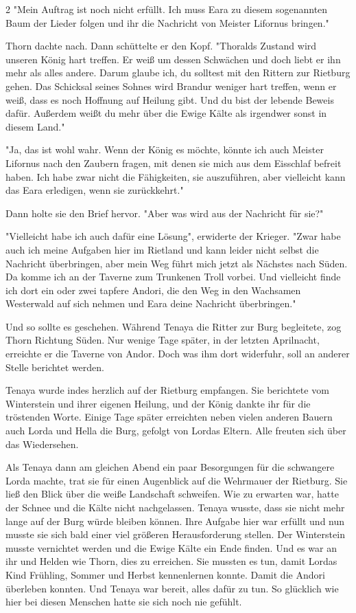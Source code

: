 \documentclass[10pt, a4paper, oneside]{book}
\begin{document}
\begin{multicols}{2}
"Mein Auftrag ist noch nicht erfüllt. Ich muss Eara zu diesem sogenannten Baum der Lieder folgen und ihr die Nachricht von Meister Lifornus bringen."

Thorn dachte nach. Dann schüttelte er den Kopf. "Thoralds Zustand wird unseren König hart treffen. Er weiß um dessen Schwächen und doch liebt er ihn mehr als alles andere. Darum glaube ich, du solltest mit den Rittern zur Rietburg gehen. Das Schicksal seines Sohnes wird Brandur weniger hart treffen, wenn er weiß, dass es noch Hoffnung auf Heilung gibt. Und du bist der lebende Beweis dafür. Außerdem weißt du mehr über die Ewige Kälte als irgendwer sonst in diesem Land."

"Ja, das ist wohl wahr. Wenn der König es möchte, könnte ich auch Meister Lifornus nach den Zaubern fragen, mit denen sie mich aus dem Eisschlaf befreit haben. Ich habe zwar nicht die Fähigkeiten, sie auszuführen, aber vielleicht kann das Eara erledigen, wenn sie zurückkehrt."

Dann holte sie den Brief hervor. "Aber was wird aus der Nachricht für sie?"

"Vielleicht habe ich auch dafür eine Lösung", erwiderte der Krieger. "Zwar habe auch ich meine Aufgaben hier im Rietland und kann leider nicht selbst die Nachricht überbringen, aber mein Weg führt mich jetzt als Nächstes nach Süden. Da komme ich an der Taverne zum Trunkenen Troll vorbei. Und vielleicht finde ich dort ein oder zwei tapfere Andori, die den Weg in den Wachsamen Westerwald auf sich nehmen und Eara deine Nachricht überbringen."

Und so sollte es geschehen. Während Tenaya die Ritter zur Burg begleitete, zog Thorn Richtung Süden. Nur wenige Tage später, in der letzten Aprilnacht, erreichte er die Taverne von Andor. Doch was ihm dort widerfuhr, soll an anderer Stelle berichtet werden. 

Tenaya wurde indes herzlich auf der Rietburg empfangen. Sie berichtete vom Winterstein und ihrer eigenen Heilung, und der König dankte ihr für die tröstenden Worte. Einige Tage später erreichten neben vielen anderen Bauern auch Lorda und Hella die Burg, gefolgt von Lordas Eltern. Alle freuten sich über das Wiedersehen. 

Als Tenaya dann am gleichen Abend ein paar Besorgungen für die schwangere Lorda machte, trat sie für einen Augenblick auf die Wehrmauer der Rietburg. Sie ließ den Blick über die weiße Landschaft schweifen. Wie zu erwarten war, hatte der Schnee und die Kälte nicht nachgelassen. Tenaya wusste, dass sie nicht mehr lange auf der Burg würde bleiben können. Ihre Aufgabe hier war erfüllt und nun musste sie sich bald einer viel größeren Herausforderung stellen. Der Winterstein musste vernichtet werden und die Ewige Kälte ein Ende finden. Und es war an ihr und Helden wie Thorn, dies zu erreichen. Sie mussten es tun, damit Lordas Kind Frühling, Sommer und Herbst kennenlernen konnte. Damit die Andori überleben konnten. Und Tenaya war bereit, alles dafür zu tun. So glücklich wie hier bei diesen Menschen hatte sie sich noch nie gefühlt. 


\end{multicols}
\end{document}
